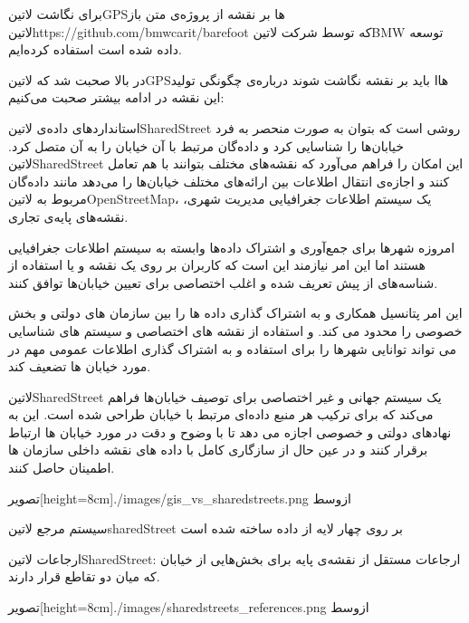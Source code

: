  برای نگاشت  لاتین{GPS}ها بر نقشه از پروژه‌ی متن باز  لاتین{https://github.com/bmwcarit/barefoot} که توسط شرکت  لاتین{BMW} توسعه داده شده است استفاده کرده‌ایم.


در بالا صحبت شد که  لاتین{GPS}هاا باید بر نقشه نگاشت شوند درباره‌ی چگونگی تولید این نقشه در ادامه بیشتر صحبت می‌کنیم:

استانداردهای داده‌ی  لاتین{SharedStreet} روشی است که بتوان به صورت منحصر به فرد خیابان‌ها را شناسایی کرد و داده‌گان مرتبط با آن خیابان را به آن متصل کرد.  لاتین{SharedStreet} این امکان را فراهم می‌آورد که نقشه‌های مختلف بتوانند با هم تعامل کنند و اجازه‌ی انتقال اطلاعات بین ارائه‌های مختلف خیابان‌ها را می‌دهد مانند داده‌گان مربوط به  لاتین{OpenStreetMap}، یک سیستم اطلاعات جغرافیایی مدیریت شهری، نقشه‌های پایه‌ی تجاری.

امروزه شهرها برای جمع‌آوری و اشتراک داده‌ها وابسته به سیستم اطلاعات جغرافیایی هستند اما این امر نیازمند این است که کاربران بر روی یک نقشه و یا استفاده از شناسه‌های از پیش تعریف شده و اغلب اختصاصی برای تعیین خیابان‌ها توافق کنند.

این امر پتانسیل همکاری و به اشتراک گذاری داده ها را بین سازمان های دولتی و بخش خصوصی را محدود می کند. و استفاده از نقشه های اختصاصی و سیستم های شناسایی می تواند توانایی شهرها را برای استفاده و به اشتراک گذاری اطلاعات عمومی مهم در مورد خیابان ها تضعیف کند.

 لاتین{SharedStreet} یک سیستم جهانی و غیر اختصاصی برای توصیف خیابان‌ها فراهم می‌کند که برای ترکیب هر منبع داده‌ای مرتبط با خیابان طراحی شده است. این به نهادهای دولتی و خصوصی اجازه می دهد تا با وضوح و دقت در مورد خیابان ها ارتباط برقرار کنند و در عین حال از سازگاری کامل با داده های نقشه داخلی سازمان ها اطمینان حاصل کنند.


  ‌تصویر[height=8cm]{./images/gis_vs_sharedstreets.png}
  ‌ازوسط


 سیستم مرجع  لاتین{sharedStreet} بر روی چهار لایه از داده ساخته شده است


 ارجاعات ‌لاتین{SharedStreet}: ارجاعات مستقل از نقشه‌ی پایه برای بخش‌هایی از خیابان که میان دو تقاطع قرار دارند.


  ‌تصویر[height=8cm]{./images/sharedstreets_references.png}
  ‌ازوسط


